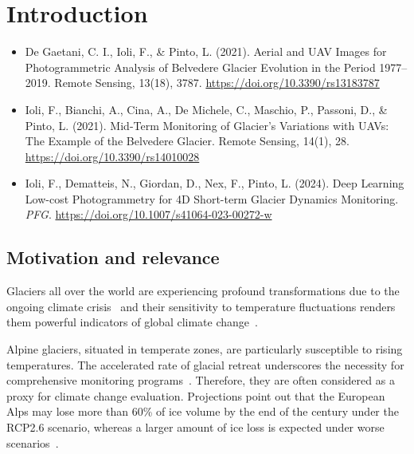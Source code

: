 \graphicspath{{figures/chapter1/}}
\onehalfspacing

\chapter{Introduction}\label{ch:introduction}

\vfill


\noindent 

\begin{itemize}
    \item De Gaetani, C. I., Ioli, F., \& Pinto, L. (2021). Aerial and UAV Images for Photogrammetric Analysis of Belvedere Glacier Evolution in the Period 1977–2019. Remote Sensing, 13(18), 3787. \url{https://doi.org/10.3390/rs13183787}
    \item Ioli, F., Bianchi, A., Cina, A., De Michele, C., Maschio, P., Passoni, D., \& Pinto, L. (2021). Mid-Term Monitoring of Glacier’s Variations with UAVs: The Example of the Belvedere Glacier. Remote Sensing, 14(1), 28. \url{https://doi.org/10.3390/rs14010028}
    \item Ioli, F., Dematteis, N., Giordan, D., Nex, F., Pinto, L. (2024). Deep Learning Low-cost Photogrammetry for 4D Short-term Glacier Dynamics Monitoring. \textit{PFG}. \url{https://doi.org/10.1007/s41064-023-00272-w}
\end{itemize}

\newpage

\section{Motivation and relevance}

Glaciers all over the world are experiencing profound transformations due to the ongoing climate crisis~\citep{Oerlemans2005} and their sensitivity to temperature fluctuations renders them powerful indicators of global climate change~\citep{Barry2016}.

Alpine glaciers, situated in temperate zones, are particularly susceptible to rising temperatures. The accelerated rate of glacial retreat underscores the necessity for comprehensive monitoring programs~\citep{Zemp2006,Sommer2020}. 
Therefore, they are often considered as a proxy for climate change evaluation.
Projections point out that the European Alps may lose more than 60\% of ice volume by the end of the century under the RCP2.6 scenario, whereas a larger amount of ice loss is expected under worse scenarios~\citep{Zekollari2019}.

